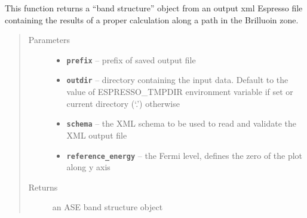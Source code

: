 \documentclass[letterpaper,10pt,english]{sphinxmanual}
\begin{document}
\begin{fulllineitems}
\label{postqe:postqe.api.get_band_structure}
This function returns a ``band structure'' object from an output xml Espresso file
containing the results of a proper calculation along a path in the Brilluoin zone.
\begin{quote}\begin{description}
\item[{Parameters}] \leavevmode\begin{itemize}
\item {} 
\textbf{\texttt{prefix}} -- prefix of saved output file

\item {} 
\textbf{\texttt{outdir}} -- directory containing the input data. Default to the value of
ESPRESSO\_TMPDIR environment variable if set or current directory (`.') otherwise

\item {} 
\textbf{\texttt{schema}} -- the XML schema to be used to read and validate the XML output file

\item {} 
\textbf{\texttt{reference\_energy}} -- the Fermi level, defines the zero of the plot along y axis

\end{itemize}

\item[{Returns}] \leavevmode
an ASE band structure object

\end{description}\end{quote}

\end{fulllineitems}

\end{document}
